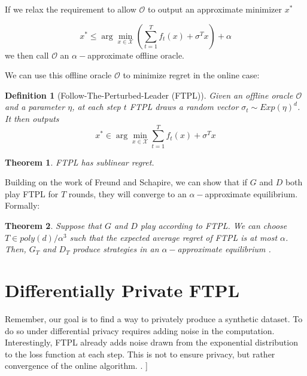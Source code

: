 \documentclass[]{article}
\newcommand{\X}{\mathcal{X}}
\newtheorem{definition}{Definition}[section]
\newtheorem{theorem}{Theorem}[section]
\theoremstyle{definition}
\begin{document}
If we relax the requirement to allow $\mathcal{O}$ to output an approximate minimizer $x^*$

\begin{equation}
    x^* \leq \arg\min_{x \in \X} \left(\sum_{t=1}^Tf_t(x) + \sigma^Tx\right) + \alpha
\end{equation}
we then call $\mathcal{O}$ an $\alpha-$approximate offline oracle.

We can use this offline oracle $\mathcal{O}$ to minimize regret in the online case:

\begin{definition}[Follow-The-Perturbed-Leader (FTPL)]
    Given an offline oracle $\mathcal{O}$ and a parameter $\eta$, at each step $t$ FTPL draws a random vector $\sigma_t \sim Exp(\eta)^d$. It then outputs 
    \begin{equation}
        x^* \in \arg\min_{x \in \X} \sum_{t=1}^Tf_t(x) + \sigma^Tx
    \end{equation}
\end{definition}

\begin{theorem}
    FTPL has sublinear regret. \cite{AGH18}
\end{theorem}

Building on the work of Freund and Schapire, we can show that if $G$ and $D$ both play FTPL for $T$ rounds, they will converge to an $\alpha-$approximate equilibrium. Formally:

\begin{theorem}\label{ftpl-equilibriu}
    Suppose that $G$ and $D$ play according to FTPL. We can choose $T \in poly(d)/\alpha^3$ such that the expected average regret of FTPL is at most $\alpha$. Then, $G_T$ and $D_T$ produce strategies in an $\alpha-$approximate equilibrium \cite{AGH18}.
\end{theorem}


\section{Differentially Private FTPL}

Remember, our goal is to find a way to privately produce a synthetic dataset. To do so under differential privacy requires adding noise in the computation. Interestingly, FTPL already adds noise drawn from the exponential distribution to the loss function at each step. This is not to ensure privacy, but rather convergence of the online algorithm. .
]
\end{document}
